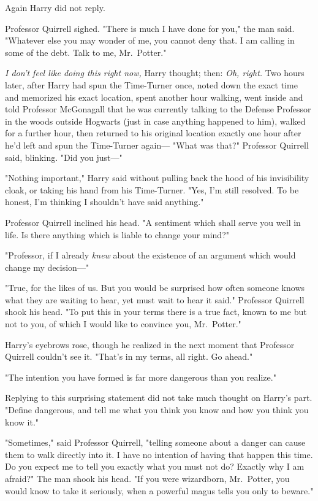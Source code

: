 Again Harry did not reply.

Professor Quirrell sighed. "There is much I have done for you," the man said.
"Whatever else you may wonder of me, you cannot deny that. I am calling in some
of the debt. Talk to me, Mr.~Potter."

\emph{I don't feel like doing this right now,} Harry thought; then: \emph{Oh,
right.}
\sbreak
Two hours later, after Harry had spun the Time-Turner once, noted down the
exact time and memorized his exact location, spent another hour walking, went
inside and told Professor McGonagall that he was currently talking to the
Defense Professor in the woods outside Hogwarts (just in case anything happened
to him), walked for a further hour, then returned to his original location
exactly one hour after he'd left and spun the Time-Turner again—
\sbreak
"What was that?" Professor Quirrell said, blinking. "Did you just—"

"Nothing important," Harry said without pulling back the hood of his
invisibility cloak, or taking his hand from his Time-Turner. "Yes, I'm still
resolved. To be honest, I'm thinking I shouldn't have said anything."

Professor Quirrell inclined his head. "A sentiment which shall serve you well
in life. Is there anything which is liable to change your mind?"

"Professor, if I already \emph{knew} about the existence of an argument which
would change my decision—"

"True, for the likes of us. But you would be surprised how often someone knows
what they are waiting to hear, yet must wait to hear it said." Professor
Quirrell shook his head. "To put this in your terms{\el} there is a true
fact, known to me but not to you, of which I would like to convince you,
Mr.~Potter."

Harry's eyebrows rose, though he realized in the next moment that Professor
Quirrell couldn't see it. "That's in my terms, all right. Go ahead."

"The intention you have formed is far more dangerous than you realize."

Replying to this surprising statement did not take much thought on Harry's
part. "Define dangerous, and tell me what you think you know and how you think
you know it."

"Sometimes," said Professor Quirrell, "telling someone about a danger can cause
them to walk directly into it. I have no intention of having that happen this
time. Do you expect me to tell you exactly what you must not do? Exactly why I
am afraid?" The man shook his head. "If you were wizardborn, Mr.~Potter, you
would know to take it seriously, when a powerful magus tells you only to
beware."

